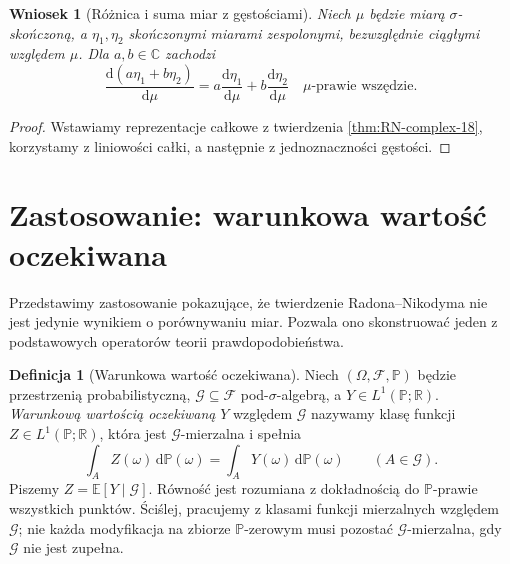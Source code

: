 \documentclass[11pt,a4paper,oneside]{book}
\numberwithin{equation}{chapter}
\theoremstyle{plain}
\newtheorem{wniosek}[twierdzenie]{Wniosek}
\theoremstyle{definition}
\newtheorem{definicja}[twierdzenie]{Definicja}
\theoremstyle{remark}
\begin{document}
\begin{wniosek}[Różnica i suma miar z gęstościami]
\label{cor:RN-linearity-18}
Niech $\mu$ będzie miarą $\sigma$-skończoną,
a $\eta_1,\eta_2$ skończonymi miarami zespolonymi,
bezwzględnie ciągłymi względem $\mu$.
Dla $a,b\in\mathbb C$ zachodzi
\[
\frac{\mathrm d(a\eta_1+b\eta_2)}{\mathrm d\mu}
=a\frac{\mathrm d\eta_1}{\mathrm d\mu}
+b\frac{\mathrm d\eta_2}{\mathrm d\mu}
\quad\mu\text{-prawie wszędzie}.
\]
\end{wniosek}
\begin{proof}
Wstawiamy reprezentacje całkowe z twierdzenia
\ref{thm:RN-complex-18}, korzystamy z liniowości całki,
a następnie z jednoznaczności gęstości.
\end{proof}

\section{Zastosowanie: warunkowa wartość oczekiwana}
Przedstawimy zastosowanie pokazujące, że twierdzenie
Radona--Nikodyma nie jest jedynie wynikiem o porównywaniu
miar. Pozwala ono skonstruować jeden z podstawowych
operatorów teorii prawdopodobieństwa.

\begin{definicja}[Warunkowa wartość oczekiwana]
\label{def:conditional-exp-18}
Niech $(\Omega,\mathcal F,\mathbb P)$ będzie przestrzenią
probabilistyczną, $\mathcal G\subseteq\mathcal F$
pod-$\sigma$-algebrą, a $Y\in L^1(\mathbb P;\mathbb R)$.
\emph{Warunkową wartością oczekiwaną} $Y$ względem
$\mathcal G$ nazywamy klasę funkcji
$Z\in L^1(\mathbb P;\mathbb R)$, która jest
$\mathcal G$-mierzalna i spełnia
\begin{equation}\label{eq:CE-def-18}
\int_A Z(\omega)\,\mathrm d\mathbb P(\omega)
=\int_A Y(\omega)\,\mathrm d\mathbb P(\omega)
\qquad(A\in\mathcal G).
\end{equation}
Piszemy $Z=\mathbb E[Y\mid\mathcal G]$.
Równość jest rozumiana z dokładnością do
$\mathbb P$-prawie wszystkich punktów. Ściślej, pracujemy
z klasami funkcji mierzalnych względem $\mathcal G$;
nie każda modyfikacja na zbiorze $\mathbb P$-zerowym musi
pozostać $\mathcal G$-mierzalna, gdy $\mathcal G$ nie jest zupełna.
\end{definicja}
\end{document}
